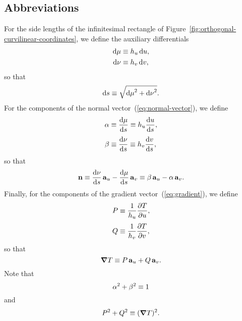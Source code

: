 \subsection{Abbreviations}
\label{sec:curvilinear.derivative.abbreviations}

For the side lengths of the infinitesimal rectangle
of Figure~\ref{fig:orthogonal-curvilinear-coordinates},
we define the auxiliary differentials
\begin{align}
  \td \mu &\ideq \scalefac[u] \td u,
    \label{eq:differential-displacement-u-component} \\
  \td \nu &\ideq \scalefac[v] \td v,
    \label{eq:differential-displacement-v-component}
\end{align}
so that
\begin{equation}
  \mathop{}\!\mathrm{d} s \equiv \sqrt{{\mathop{}\!\mathrm{d} \mu}^2 + {\mathop{}\!\mathrm{d} \nu}^2}.
  \label{eq:differential-arc-length-abbreviated}
\end{equation}
For the components of the normal vector~(\ref{eq:normal-vector}),
we define
\begin{align}
  \alpha &\ideq \tder{\mu}{s} \ideq \scalefac[u] \tder{u}{s},
    \label{eq:tangent-u-component} \\[\tallspace]
  \beta &\ideq \tder{\nu}{s} \ideq \scalefac[v] \tder{v}{s},
    \label{eq:tangent-v-component}
\end{align}
so that
\begin{equation}
  \normalvec
    \ideq \tder{\nu}{s} \basisvec{u} - \tder{\mu}{s} \basisvec{v}
    \ideq \beta \basisvec{u} - \alpha \basisvec{v}.
  \label{eq:normal-vector-abbreviated}
\end{equation}
Finally, for the components of the gradient vector~(\ref{eq:gradient}),
we define
\begin{align}
  P &\ideq \frac{1}{\scalefac[u]} \pder{T}{u},
    \label{eq:gradient-u-component} \\[\tallspace]
  Q &\ideq \frac{1}{\scalefac[v]} \pder{T}{v},
    \label{eq:gradient-v-component}
\end{align}
so that
\begin{equation}
  \mathop{}\!\boldsymbol{\mathbf{\nabla}} T \equiv P \mathop{}\!\boldsymbol{\mathbf{a}}_{u} + Q \mathop{}\!\boldsymbol{\mathbf{a}}_{v}.
  \label{eq:gradient-abbreviated}
\end{equation}
Note that
\begin{equation}
  \alpha^2 + \beta^2 \equiv 1
  \label{eq:tangent-pythagoras}
\end{equation}
and
\begin{equation}
  P^2 + Q^2 \equiv (\mathop{}\!\boldsymbol{\mathbf{\nabla}} T)^2.
  \label{eq:gradient-pythagoras}
\end{equation}

